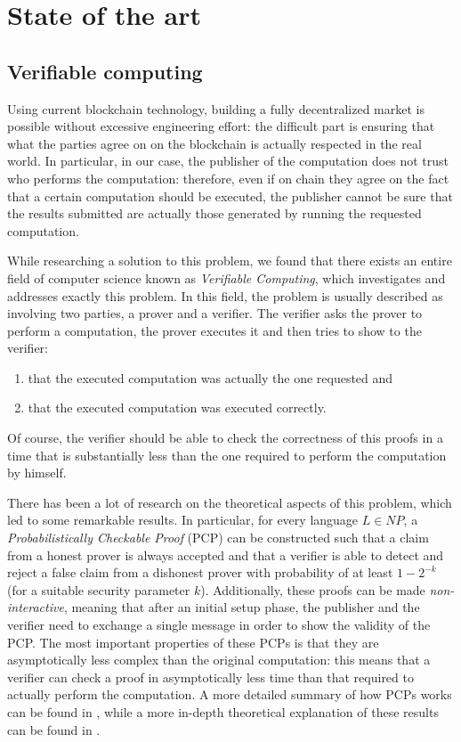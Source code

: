 
\section{State of the art}
\label{sect:state-of-the-art}

\subsection{Verifiable computing}
Using current blockchain technology, building a fully decentralized market is possible without excessive engineering effort: the difficult part is ensuring that what the parties agree on on the blockchain is actually respected in the real world. In particular, in our case, the publisher of the computation does not trust who performs the computation: therefore, even if on chain they agree on the fact that a certain computation should be executed, the publisher cannot be sure that the results submitted are actually those generated by running the requested computation.

While researching a solution to this problem, we found that there exists an entire field of computer science known as \emph{Verifiable Computing}, which investigates and addresses exactly this problem. In this field, the problem is usually described as involving two parties, a prover and a verifier. The verifier asks the prover to perform a computation, the prover executes it and then tries to show to the verifier:

\begin{enumerate}
    \item that the executed computation was actually the one requested and
    \item that the executed computation was executed correctly.
\end{enumerate}

Of course, the verifier should be able to check the correctness of this proofs in a time that is substantially less than the one required to perform the computation by himself.

There has been a lot of research on the theoretical aspects of this problem, which led to some remarkable results. In particular, for every language $L \in NP$, a \emph{Probabilistically Checkable Proof} (PCP) can be constructed such that a claim from a honest prover is always accepted and that a verifier is able to detect and reject a false claim from a dishonest prover with probability of at least $1 - 2^{-k}$ (for a suitable security parameter $k$). Additionally, these proofs can be made \emph{non-interactive}, meaning that after an initial setup phase, the publisher and the verifier need to exchange a single message in order to show the validity of the PCP. The most important properties of these PCPs is that they are asymptotically less complex than the original computation: this means that a verifier can check a proof in asymptotically less time than that required to actually perform the computation. A more detailed summary of how PCPs works can be found in \citet{verifying-computations-walfish}, while a more in-depth theoretical explanation of these results can be found in \citet{muggles-goldwasser}.

